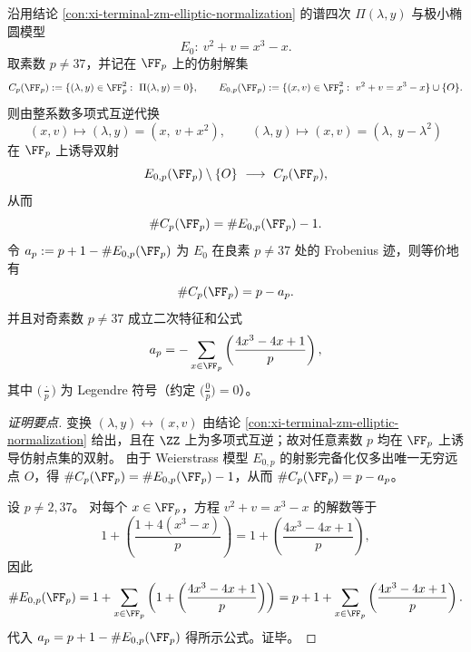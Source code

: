 \begin{conclusion}\label{con:xi-terminal-zm-elliptic-finite-field-point-count}
沿用结论 \ref{con:xi-terminal-zm-elliptic-normalization} 的谱四次 \(\Pi(\lambda,y)\) 与极小椭圆模型
\[
E_0:\ v^{2}+v=x^{3}-x.
\]
取素数 \(p\neq 37\)，并记在 \(\FF_p\) 上的仿射解集
\[
C_p(\FF_p):=\{(\lambda,y)\in\FF_p^{2}:\ \Pi(\lambda,y)=0\},
\qquad
E_{0,p}(\FF_p):=\{(x,v)\in\FF_p^{2}:\ v^{2}+v=x^{3}-x\}\cup\{O\}.
\]
则由整系数多项式互逆代换
\[
(x,v)\longmapsto(\lambda,y)=(x,\ v+x^{2}),
\qquad
(\lambda,y)\longmapsto(x,v)=(\lambda,\ y-\lambda^{2})
\]
在 \(\FF_p\) 上诱导双射
\[
E_{0,p}(\FF_p)\setminus\{O\}\ \longrightarrow\ C_p(\FF_p),
\]
从而
\[
\#C_p(\FF_p)=\#E_{0,p}(\FF_p)-1.
\]
令
\(
a_p:=p+1-\#E_{0,p}(\FF_p)
\)
为 \(E_0\) 在良素 \(p\neq 37\) 处的 Frobenius 迹，则等价地有
\[
\#C_p(\FF_p)=p-a_p.
\]
并且对奇素数 \(p\neq 37\) 成立二次特征和公式
\[
a_p=-\sum_{x\in\FF_p}\left(\frac{4x^{3}-4x+1}{p}\right),
\]
其中 \(\bigl(\tfrac{\cdot}{p}\bigr)\) 为 Legendre 符号（约定 \(\bigl(\tfrac{0}{p}\bigr)=0\)）。
\end{conclusion}
\begin{proof}[证明要点]
变换 \((\lambda,y)\leftrightarrow(x,v)\) 由结论 \ref{con:xi-terminal-zm-elliptic-normalization} 给出，且在 \(\ZZ\) 上为多项式互逆；故对任意素数 \(p\) 均在 \(\FF_p\) 上诱导仿射点集的双射。
由于 Weierstrass 模型 \(E_{0,p}\) 的射影完备化仅多出唯一无穷远点 \(O\)，得 \(\#C_p(\FF_p)=\#E_{0,p}(\FF_p)-1\)，从而 \(\#C_p(\FF_p)=p-a_p\)。
\par
设 \(p\neq 2,37\)。
对每个 \(x\in\FF_p\)，方程 \(v^{2}+v=x^{3}-x\) 的解数等于
\[
1+\left(\frac{1+4(x^{3}-x)}{p}\right)=1+\left(\frac{4x^{3}-4x+1}{p}\right),
\]
因此
\[
\#E_{0,p}(\FF_p)
=1+\sum_{x\in\FF_p}\left(1+\left(\frac{4x^{3}-4x+1}{p}\right)\right)
=p+1+\sum_{x\in\FF_p}\left(\frac{4x^{3}-4x+1}{p}\right).
\]
代入 \(a_p=p+1-\#E_{0,p}(\FF_p)\) 得所示公式。证毕。
\end{proof}


